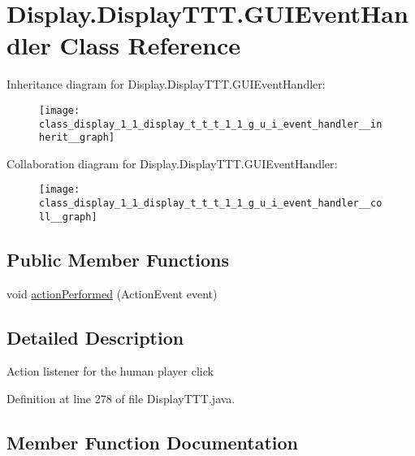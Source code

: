 \hypertarget{class_display_1_1_display_t_t_t_1_1_g_u_i_event_handler}{}\section{Display.\+Display\+T\+T\+T.\+G\+U\+I\+Event\+Handler Class Reference}
\label{class_display_1_1_display_t_t_t_1_1_g_u_i_event_handler}


Inheritance diagram for Display.\+Display\+T\+T\+T.\+G\+U\+I\+Event\+Handler\+:\nopagebreak
\begin{figure}[H]
\begin{center}
\leavevmode
\texttt{[image: class\_display\_1\_1\_display\_t\_t\_t\_1\_1\_g\_u\_i\_event\_handler\_\_inherit\_\_graph]}
\end{center}
\end{figure}


Collaboration diagram for Display.\+Display\+T\+T\+T.\+G\+U\+I\+Event\+Handler\+:\nopagebreak
\begin{figure}[H]
\begin{center}
\leavevmode
\texttt{[image: class\_display\_1\_1\_display\_t\_t\_t\_1\_1\_g\_u\_i\_event\_handler\_\_coll\_\_graph]}
\end{center}
\end{figure}
\subsection*{Public Member Functions}
\begin{DoxyCompactItemize}
\item 
void \hyperlink{class_display_1_1_display_t_t_t_1_1_g_u_i_event_handler_a7becbf462a2f5b6fd3159de0abdc37fe}{action\+Performed} (Action\+Event event)
\end{DoxyCompactItemize}


\subsection{Detailed Description}
Action listener for the human player click 

Definition at line 278 of file Display\+T\+T\+T.\+java.



\subsection{Member Function Documentation}
\hypertarget{class_display_1_1_display_t_t_t_1_1_g_u_i_event_handler_a7becbf462a2f5b6fd3159de0abdc37fe}{}
